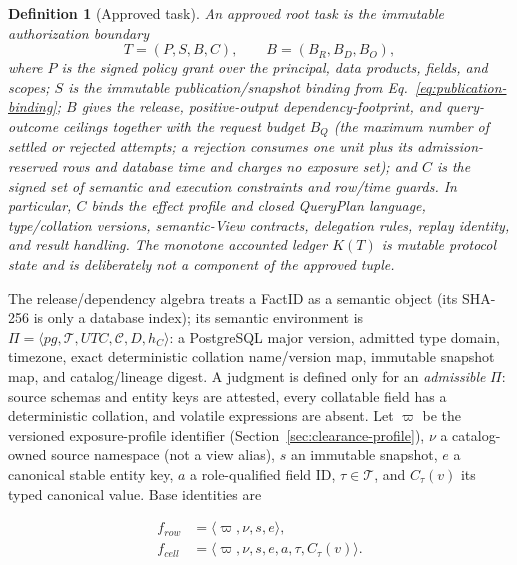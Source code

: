 \documentclass[10pt,journal,compsoc]{IEEEtran}
\newtheorem{definition}{Definition}
\begin{document}
\begin{definition}[Approved task]
\label{def:task}
An approved root task is the immutable authorization boundary
\begin{equation}
 T=(P,S,B,C), \qquad B=(B_R,B_D,B_O),
 \label{eq:task-tuple}
\end{equation}
where $P$ is the signed policy grant over the principal, data products,
fields, and scopes; $S$ is the immutable publication/snapshot binding from
Eq.~\eqref{eq:publication-binding}; $B$ gives the release, positive-output
dependency-footprint, and query-outcome ceilings together with the request
budget $B_Q$ (the maximum number of settled or rejected attempts; a
rejection consumes one unit plus its admission-reserved rows and database
time and charges no exposure set); and $C$ is the signed set of
semantic and execution constraints and row/time guards.  In particular, $C$ binds the effect
profile and closed QueryPlan language, type/collation versions, semantic-View
contracts, delegation rules, replay identity, and result handling.  The
monotone accounted ledger $K(T)$ is mutable protocol state and is deliberately
\emph{not} a component of the approved tuple.
\end{definition}

The release/dependency algebra treats a FactID as a semantic object (its
SHA-256 is only a database index); its semantic environment is
$\Pi=\langle pg,\mathcal T,UTC,\mathcal C,D,h_C\rangle$: a PostgreSQL major
version, admitted type domain, timezone, exact deterministic collation
name/version map, immutable snapshot map, and catalog/lineage digest.  A
judgment is defined only for an \emph{admissible} $\Pi$: source schemas and
entity keys are attested, every collatable field has a deterministic collation,
and volatile expressions are absent.  Let $\varpi$ be the versioned
exposure-profile identifier (Section~\ref{sec:clearance-profile}), $\nu$ a
catalog-owned source namespace (not a view alias), $s$ an immutable snapshot,
$e$ a canonical stable entity key, $a$ a role-qualified field ID, $\tau\in\mathcal T$, and
$C_\tau(v)$ its typed canonical value.  Base identities are

\begin{align}
 f_{row}&=\langle\varpi,\nu,s,e\rangle,\\
 f_{cell}&=\langle\varpi,\nu,s,e,a,\tau,C_\tau(v)\rangle .
 \label{eq:fact}
\end{align}
\end{document}
